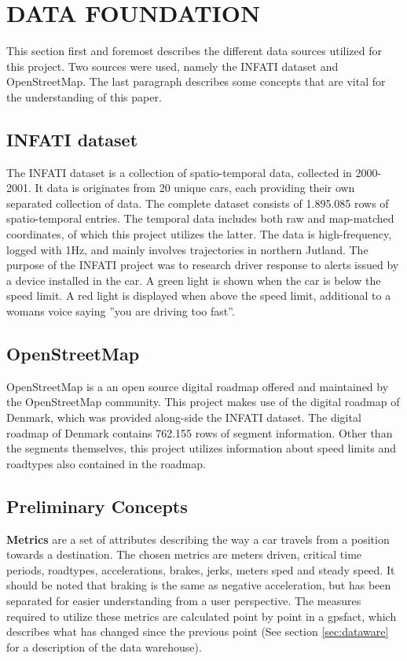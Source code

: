 \section{DATA FOUNDATION}\label{sec:datafound}

This section first and foremost describes the different data sources utilized for this project. Two sources were used, namely the INFATI dataset and OpenStreetMap. The last paragraph describes some concepts that are vital for the understanding of this paper. 

\subsection{INFATI dataset}
The INFATI dataset\cite{art:INFATI} is a collection of spatio-temporal data, collected in 2000-2001. It data is originates from 20 unique cars, each providing their own separated collection of data. The complete dataset consists of 1.895.085 rows of spatio-temporal entries. The temporal data includes both raw and map-matched coordinates, of which this project utilizes the latter. The data is high-frequency, logged with 1Hz, and mainly involves trajectories in northern Jutland. The purpose of the INFATI\cite{art:INFATI} project was to research driver response to alerts issued by a device installed in the car. A green light is shown when the car is below the speed limit. A red light is displayed when above the speed limit, additional to a womans voice saying ''you are driving too fast''.

\subsection{OpenStreetMap}
OpenStreetMap\cite{osm} is a an open source digital roadmap offered and maintained by the OpenStreetMap community. This project makes use of the digital roadmap of Denmark, which was provided along-side the INFATI dataset\cite{art:INFATI}. The digital roadmap of Denmark contains 762.155 rows of segment information. Other than the segments themselves, this project utilizes information about speed limits and roadtypes also contained in the roadmap.

\subsection{Preliminary Concepts}\label{subsec:precon}
\textbf{Metrics} are a set of attributes describing the way a car travels from a position towards a destination. The chosen metrics are meters driven, critical time periods, roadtypes, accelerations, brakes, jerks, meters sped and steady speed. It should be noted that braking is the same as negative acceleration, but has been separated for easier understanding from a user perspective. The measures required to utilize these metrics are calculated point by point in a gpsfact, which describes what has changed since the previous point (See section \ref{sec:dataware} for a description of the data warehouse).


